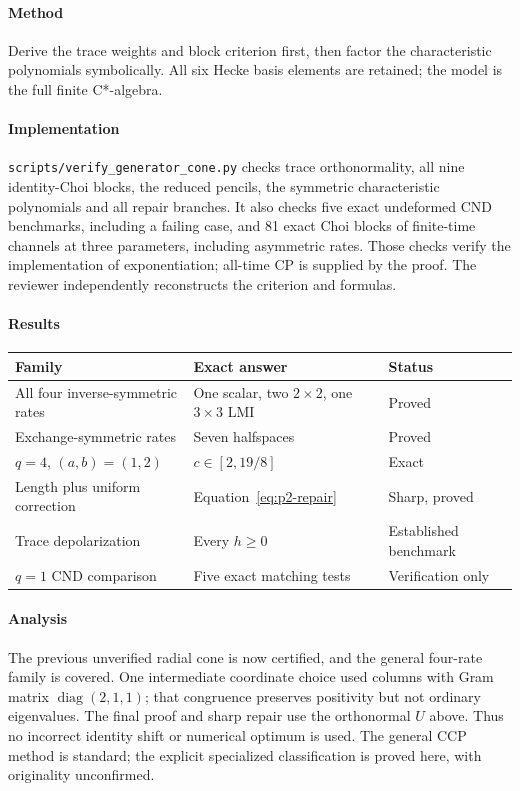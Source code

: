 \paragraph{Method} Derive the trace weights and block criterion first,
then factor the characteristic polynomials symbolically. All six Hecke
basis elements are retained; the model is the full finite C*-algebra.
\paragraph{Implementation} \texttt{scripts/verify\_generator\_cone.py}
checks trace orthonormality, all nine identity-Choi blocks, the reduced
pencils, the symmetric characteristic polynomials and all repair branches.
It also checks five exact undeformed CND benchmarks, including a failing
case, and 81 exact Choi blocks of finite-time channels at three parameters,
including asymmetric rates. Those checks verify the implementation of
exponentiation; all-time CP is supplied by the proof. The reviewer
independently reconstructs the criterion and formulas.
\paragraph{Results}
{\setlength{\tabcolsep}{8pt}\renewcommand{\arraystretch}{1.2}
\begin{tabular}{lll}\toprule
Family & Exact answer & Status\\\midrule
All four inverse-symmetric rates & One scalar, two $2\times2$, one $3\times3$ LMI & Proved\\
Exchange-symmetric rates & Seven halfspaces & Proved\\
$q=4$, $(a,b)=(1,2)$ & $c\in[2,19/8]$ & Exact\\
Length plus uniform correction & Equation~\eqref{eq:p2-repair} & Sharp, proved\\
Trace depolarization & Every $h\geq0$ & Established benchmark\\
$q=1$ CND comparison & Five exact matching tests & Verification only\\\bottomrule
\end{tabular}}
\paragraph{Analysis} The previous unverified radial cone is now certified,
and the general four-rate family is covered. One intermediate coordinate
choice used columns with Gram matrix $\operatorname{diag}(2,1,1)$;
that congruence preserves positivity but not ordinary eigenvalues. The
final proof and sharp repair use the orthonormal $U$ above. Thus no
incorrect identity shift or numerical optimum is used. The general CCP
method is standard; the explicit specialized classification is proved
here, with originality unconfirmed.
